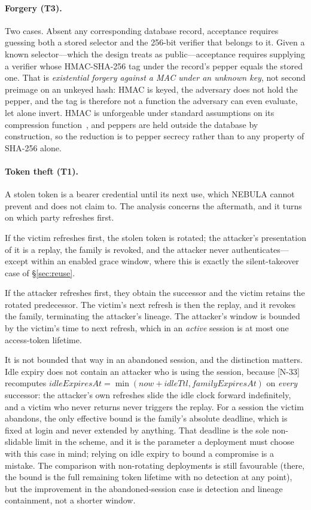 \documentclass[11pt]{article}
\begin{document}
\paragraph{Forgery (T3).} Two cases. Absent any corresponding database
record, acceptance requires guessing both a stored selector and the 256-bit
verifier that belongs to it. Given a known selector---which the design
treats as public---acceptance requires supplying a verifier whose
HMAC-SHA-256 tag under the record's pepper equals the stored one. That is
\emph{existential forgery against a MAC under an unknown key}, not second
preimage on an unkeyed hash: HMAC is keyed, the adversary does not hold the
pepper, and the tag is therefore not a function the adversary can even
evaluate, let alone invert. HMAC is unforgeable under standard assumptions
on its compression function~\cite{bellare2006,rfc2104,fips198}, and peppers
are held outside the database by construction, so the reduction is to pepper
secrecy rather than to any property of SHA-256 alone.

\paragraph{Token theft (T1).} A stolen token is a bearer credential until its
next use, which NEBULA cannot prevent and does not claim to. The analysis
concerns the aftermath, and it turns on which party refreshes first.

If the victim refreshes first, the stolen token is rotated; the attacker's
presentation of it is a replay, the family is revoked, and the attacker never
authenticates---except within an enabled grace window, where this is exactly
the silent-takeover case of \S\ref{sec:reuse}.

If the attacker refreshes first, they obtain the successor and the victim
retains the rotated predecessor. The victim's next refresh is then the
replay, and it revokes the family, terminating the attacker's lineage. The
attacker's window is bounded by the victim's time to next refresh, which in
an \emph{active} session is at most one access-token lifetime.

It is not bounded that way in an abandoned session, and the distinction
matters. Idle expiry does not contain an attacker who is using the session,
because [N-33] recomputes
$\mathit{idleExpiresAt} = \min(\mathit{now} + \mathit{idleTtl},
\mathit{familyExpiresAt})$ on \emph{every} successor: the attacker's own
refreshes slide the idle clock forward indefinitely, and a victim who never
returns never triggers the replay. For a session the victim abandons, the
only effective bound is the family's absolute deadline, which is fixed at
login and never extended by anything. That deadline is the sole non-slidable
limit in the scheme, and it is the parameter a deployment must choose with
this case in mind; relying on idle expiry to bound a compromise is a
mistake. The comparison with non-rotating deployments is still favourable
(there, the bound is the full remaining token lifetime with no detection at
any point), but the improvement in the abandoned-session case is detection
and lineage containment, not a shorter window.
\end{document}
